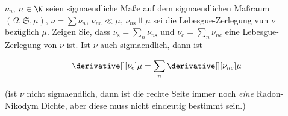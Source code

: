 
\begin{exercise}

$\nu_n$, $n \in \N$ seien sigmaendliche Maße auf dem sigmaendlichen Maßraum $(\Omega, \mathfrak S, \mu)$, $\nu = \sum \nu_n$, $\nu_{n \mathrm c} \ll \mu$, $\nu_{n \mathrm{s}} \Bot \mu$ sei die Lebesgue-Zerlegung vun $\nu$ bezüglich $\mu$.
Zeigen Sie, dass $\nu_\mathrm{s} = \sum_n \nu_{n \mathrm{s}}$ und $\nu_\mathrm{c} = \sum_n \nu_{n \mathrm c}$ eine Lebesgue-Zerlegung von $\nu$ ist.
Ist $\nu$ auch sigmaendlich, dann ist

\begin{align*}
    \derivative[][\nu_\mathrm{c}]{\mu}
    =
    \sum_n
        \derivative[][\nu_{n \mathrm c}]{\mu}
\end{align*}

(ist $\nu$ nicht sigmaendlich, dann ist die rechte Seite immer noch \textit{eine} Radon-Nikodym Dichte, aber diese muss nicht eindeutig bestimmt sein.)

\end{exercise}


